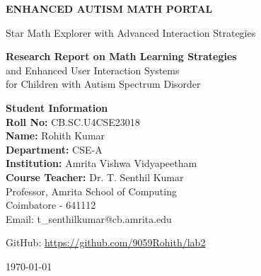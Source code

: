 \documentclass[11pt, a4paper]{article}
\begin{document}
\begin{titlepage}
    \centering
    \vspace*{1.5cm}
    
    {\Huge\bfseries\color{primaryblue} ENHANCED AUTISM MATH PORTAL\par}
    \vspace{0.8cm}
    {\Large\color{accentgreen} Star Math Explorer with Advanced Interaction Strategies\par}
    
    \vspace{2cm}
    
    \begin{tcolorbox}[colback=primaryblue!10, colframe=primaryblue, width=0.8\textwidth]
        \centering
        \Large\textbf{Research Report on Math Learning Strategies}\\
        \large and Enhanced User Interaction Systems\\
        \vspace{0.3cm}
        for Children with Autism Spectrum Disorder
    \end{tcolorbox}
    
    \vspace{2.5cm}
    
    \begin{tcolorbox}[colback=accentgreen!10, colframe=accentgreen, width=0.7\textwidth]
        \centering
        \textbf{Student Information}\\[0.3cm]
        \textbf{Roll No:} CB.SC.U4CSE23018\\
        \textbf{Name:} Rohith Kumar\\
        \textbf{Department:} CSE-A\\
        \textbf{Institution:} Amrita Vishwa Vidyapeetham\\[0.3cm]
        \textbf{Course Teacher:} Dr. T. Senthil Kumar\\
        Professor, Amrita School of Computing\\
        Coimbatore - 641112\\
        Email: t\_senthilkumar@cb.amrita.edu
    \end{tcolorbox}
    
    \vspace{1.5cm}
    
    {\large GitHub: \url{https://github.com/9059Rohith/lab2}\par}
    
    \vfill
    {\large \today\par}
\end{titlepage}
\end{document}
